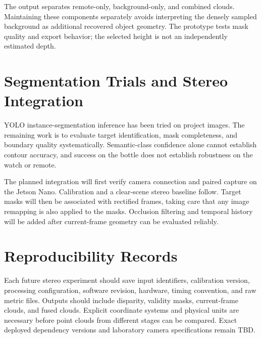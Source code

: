 The output separates remote-only, background-only, and combined clouds. Maintaining these components separately avoids interpreting the densely sampled background as additional recovered object geometry. The prototype tests mask quality and export behavior; the selected height is not an independently estimated depth.

\section{Segmentation Trials and Stereo Integration}
YOLO instance-segmentation inference has been tried on project images. The remaining work is to evaluate target identification, mask completeness, and boundary quality systematically. Semantic-class confidence alone cannot establish contour accuracy, and success on the bottle does not establish robustness on the watch or remote.

The planned integration will first verify camera connection and paired capture on the Jetson Nano. Calibration and a clear-scene stereo baseline follow. Target masks will then be associated with rectified frames, taking care that any image remapping is also applied to the masks. Occlusion filtering and temporal history will be added after current-frame geometry can be evaluated reliably.

\section{Reproducibility Records}
Each future stereo experiment should save input identifiers, calibration version, processing configuration, software revision, hardware, timing convention, and raw metric files. Outputs should include disparity, validity masks, current-frame clouds, and fused clouds. Explicit coordinate systems and physical units are necessary before point clouds from different stages can be compared. Exact deployed dependency versions and laboratory camera specifications remain TBD.
